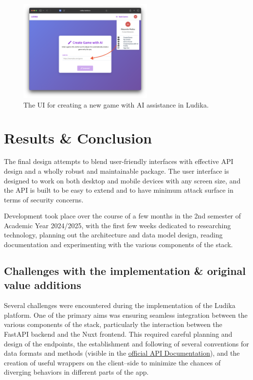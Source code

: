 \documentclass[11pt,italian,a4paper]{article}
\begin{document}
\begin{figure}[H]
    \centering
    \includegraphics[width=0.6\textwidth,trim={0 1cm 0 1cm}]{figures/create_with_ai.png}
    \caption{The UI for creating a new game with AI assistance in Ludika.}
\end{figure}

\section{Results \& Conclusion}

The final design attempts to blend user-friendly interfaces with effective API design and a wholly robust and maintainable package. The user interface is designed to work on both desktop and mobile devices with any screen size, and the API is built to be easy to extend and to have minimum attack surface in terms of security concerns.

Development took place over the course of a few months in the 2nd semester of Academic Year 2024/2025, with the first few weeks dedicated to researching technology, planning out the architecture and data model design, reading documentation and experimenting with the various components of the stack.

\subsection{Challenges with the implementation \& original value additions}

Several challenges were encountered during the implementation of the Ludika platform. One of the primary aims was ensuring seamless integration between the various components of the stack, particularly the interaction between the FastAPI backend and the Nuxt frontend. This required careful planning and design of the endpoints, the establishment and following of several conventions for data formats and methods (visible in the \href{https://ludika.modica.io}{official API Documentation}), and the creation of useful wrappers on the client--side to minimize the chances of diverging behaviors in different parts of the app.
\end{document}
